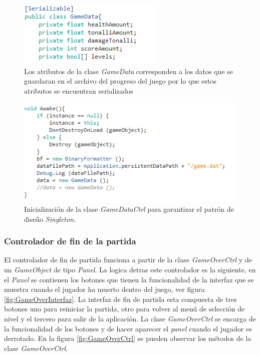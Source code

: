 	\begin{figure}[h]
		\centering
		\includegraphics[height=0.15 \textheight]{03TrabajoRealizado/imagenes/GameData.png}
		\caption{Los atributos de la clase \textit{GameData} corresponden a los 
		datos que se guardaran en el archivo del progreso del juego por lo que 
		estos atributos se encuentran serializados}
		\label{fig:GameData}
	\end{figure}   
	
	\begin{figure}[h]
		\centering
		\includegraphics[height=0.2 \textheight]{03TrabajoRealizado/imagenes/gameDataCtrl.png}
		\caption{Inicialización de la clase \textit{GameDataCtrl} para 
		garantizar el patrón de diseño \textit{Singleton}.}
		\label{fig:GameDataCtrl}
	\end{figure}

\subsubsection{Controlador de fin de la partida}
El controlador de fin de partida funciona a partir de la clase 
\textit{GameOverCtrl} y de un \textit{GameObject} de tipo \textit{Panel}. La 
logica detras este controlador es la siguiente, en el \textit{Panel} se 
contienen los botones que tienen la funcionalidad de la interfaz que se muestra 
cuando el jugador ha muerto dentro del juego, ver figura 
\ref{fig:GameOverInterfaz}. La interfaz de fin de partida esta compuesta de tres 
botones uno para reiniciar la partida, otro para volver al menú de selección de 
nivel y el tercero para salir de la aplicación. La clase \textit{GameOverCtrl} 
se encarga de la funcionalidad de los botones y de hacer aparecer el 
\textit{panel} cuando el jugador es derrotado. En la figura 
\ref{fig:GameOverCtrl} se pueden observar los métodos de la clase \textit{GameOverCtrl}. 

